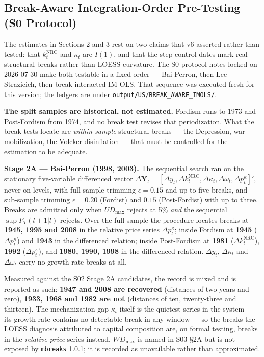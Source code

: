 \documentclass[11pt,a4paper]{article}
\begin{document}
\FloatBarrier

\subsection{Break-Aware Integration-Order Pre-Testing (S0\* Protocol)}

The estimates in Sections 2 and 3 rest on two claims that v6 asserted rather than tested: that $k_t^{\text{NRC}}$ and $\kappa_t$ are $I(1)$, and that the step-control dates mark real structural breaks rather than LOESS curvature. The S0\* protocol notes locked on 2026-07-30 make both testable in a fixed order --- Bai-Perron, then Lee-Strazicich, then break-interacted IM-OLS. That sequence was executed fresh for this version; the ledgers are under \texttt{output/US/BREAK\_AWARE\_IMOLS/}.

\textbf{The split samples are historical, not estimated.} Fordism runs to 1973 and Post-Fordism from 1974, and no break test revises that periodization. What the break tests locate are \textit{within-sample} structural breaks --- the Depression, war mobilization, the Volcker disinflation --- that must be controlled for the estimation to be adequate.

\noindent\textbf{Stage 2A --- Bai-Perron (1998, 2003).} The sequential search ran on the stationary five-variable differenced vector $\Delta\mathbf{Y}_t = [\Delta y_t, \Delta k_t^{\text{NRC}}, \Delta\kappa_t, \Delta\omega_t, \Delta p_t^{\kappa}]'$, never on levels, with full-sample trimming $\epsilon = 0.15$ and up to five breaks, and sub-sample trimming $\epsilon = 0.20$ (Fordist) and $0.15$ (Post-Fordist) with up to three. Breaks are admitted only when $UD_{\max}$ rejects at 5\% \textit{and} the sequential $\sup F_T(l+1|l)$ rejects. Over the full sample the procedure locates breaks at \textbf{1945, 1995 and 2008} in the relative price series $\Delta p_t^{\kappa}$; inside Fordism at \textbf{1945} ($\Delta p_t^{\kappa}$) and \textbf{1943} in the differenced relation; inside Post-Fordism at \textbf{1981} ($\Delta k_t^{\text{NRC}}$), \textbf{1992} ($\Delta p_t^{\kappa}$), and \textbf{1980, 1990, 1998} in the differenced relation. $\Delta y_t$, $\Delta\kappa_t$ and $\Delta\omega_t$ carry no growth-rate breaks at all.

Measured against the S02 Stage 2A candidates, the record is mixed and is reported as such: \textbf{1947 and 2008 are recovered} (distances of two years and zero), \textbf{1933, 1968 and 1982 are not} (distances of ten, twenty-three and thirteen). The mechanization gap $\kappa_t$ itself is the quietest series in the system --- its growth rate contains no detectable break in any window --- so the breaks the LOESS diagnosis attributed to capital composition are, on formal testing, breaks in the \textit{relative price} series instead. $WD_{\max}$ is named in S03 \S2A but is not exposed by \texttt{mbreaks} 1.0.1; it is recorded as unavailable rather than approximated.
\end{document}
